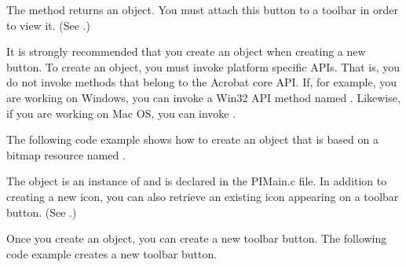 \documentclass[letterpaper,12pt,english,openany,oneside]{sphinxmanual}
\begin{document}
The  method returns an  object. You must attach this button to a toolbar in order to view it. (See .)

It is strongly recommended that you create an  object when creating a new button. To create an  object, you must invoke platform specific APIs. That is, you do not invoke methods that belong to the Acrobat core API. If, for example, you are working on Windows, you can invoke a Win32 API method named . Likewise, if you are working on Mac OS, you can invoke .

The following code example shows how to create an  object that is based on a bitmap resource named .

\begin{sphinxVerbatim}[commandchars=\\\{\}]
    
\end{sphinxVerbatim}

The  object is an instance of  and is declared in the PIMain.c file. In addition to creating a new icon, you can also retrieve an existing icon appearing on a toolbar button. (See .)

Once you create an  object, you can create a new toolbar button. The following code example creates a new toolbar button.

\begin{sphinxVerbatim}[commandchars=\\\{\}]
   
      

   
       

   
        
\end{sphinxVerbatim}
\end{document}
